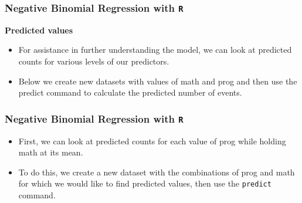 \documentclass[MASTER.tex]{subfiles}
\begin{document}
%
\begin{frame}[fragile]
	\frametitle{Negative Binomial Regression with \texttt{R} }
	\Large
	
	\textbf{Predicted values}
	\begin{itemize}
\item	For assistance in further understanding the model, we can look at predicted counts for various levels of our predictors. 
\item Below we create new datasets with values of math and prog and then use the predict command to calculate the predicted number of events.
\end{itemize}
\end{frame}
\begin{frame}[fragile]
	\frametitle{Negative Binomial Regression with \texttt{R} }
	\Large
	
	\begin{itemize}
\item	First, we can look at predicted counts for each value of prog while holding math at its mean. 
\item To do this, we create a new dataset with the combinations of prog and math for which we would like to find predicted values, then use the \texttt{predict} command.
\end{itemize}
\end{frame}
\end{document}
